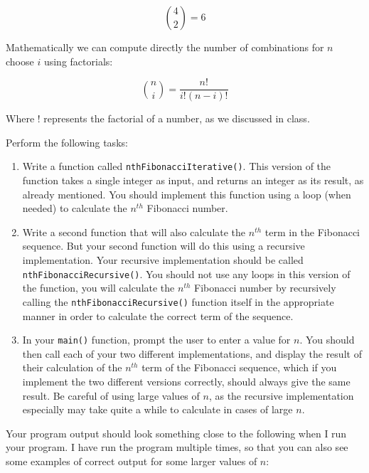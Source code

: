 \documentclass[11pt]{article}
\begin{document}
$$
{4 \choose 2} = 6
$$

Mathematically we can compute directly the number of combinations for
$n$ choose $i$ using factorials:

$$
{n \choose i} = \frac{n!}{i! (n - i)!}
$$

Where $!$ represents the factorial of a number, as we discussed in
class.




Perform the following tasks:

\begin{enumerate}
\item Write a function called \verb~nthFibonacciIterative()~.  This version of
   the function takes a single integer as input, and returns an
   integer as its result, as already mentioned.  You should implement
   this function using a loop (when needed) to calculate the $n^{th}$
   Fibonacci number.
\item Write a second function that will also calculate the $n^{th}$ term
   in the Fibonacci sequence.  But your second function will do this
   using a recursive implementation.  Your recursive implementation
   should be called \verb~nthFibonacciRecursive()~.  You should not use any
   loops in this version of the function, you will calculate the
   $n^{th}$ Fibonacci number by recursively calling the
   \verb~nthFibonacciRecursive()~ function itself in the appropriate manner
   in order to calculate the correct term of the sequence.
\item In your \verb~main()~ function, prompt the user to enter a value for $n$.
   You should then call each of your two different implementations, and
   display the result of their calculation of the $n^{th}$ term of the
   Fibonacci sequence, which if you implement the two different versions
   correctly, should always give the same result.  Be careful of using
   large values of $n$, as the recursive implementation especially may
   take quite a while to calculate in cases of large $n$.
\end{enumerate}

Your program output should look something close to the following when I
run your program.  I have run the program multiple times, so that you
can also see some examples of correct output for some larger values
of $n$:
\end{document}
